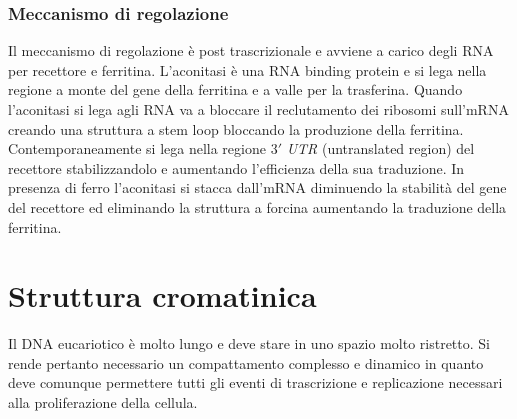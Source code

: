 \subsubsection{Meccanismo di regolazione}
Il meccanismo di regolazione \`e post trascrizionale e avviene a carico degli RNA per recettore e ferritina. L'aconitasi \`e una RNA binding protein e si lega nella regione a monte del
gene della ferritina e a valle per la trasferina. Quando l'aconitasi si lega agli RNA va a bloccare il reclutamento dei ribosomi sull'mRNA creando una struttura a stem loop bloccando la
produzione della ferritina. Contemporaneamente si lega nella regione $3'$ \emph{UTR} (untranslated region) del recettore stabilizzandolo e aumentando l'efficienza della sua traduzione. 
In presenza di ferro l'aconitasi si stacca dall'mRNA diminuendo la stabilit\`a del gene del recettore ed eliminando la struttura a forcina aumentando la traduzione della ferritina. 

\section{Struttura cromatinica}
Il DNA eucariotico \`e molto lungo e deve stare in uno spazio molto ristretto. Si rende pertanto necessario un compattamento complesso e dinamico in quanto deve comunque permettere 
tutti gli eventi di trascrizione e replicazione necessari alla proliferazione della cellula. 







